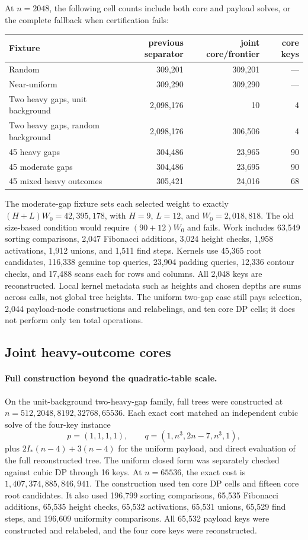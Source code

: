 \documentclass[11pt]{article}
\begin{document}
At $n=2048$, the following cell counts include both core and payload solves,
or the complete fallback when certification fails:
\begin{center}\small
\begin{tabular}{lrrr}
\toprule
Fixture & previous separator & joint core/frontier & core keys\\
\midrule
Random & 309,201 & 309,201 & ---\\
Near-uniform & 309,290 & 309,290 & ---\\
Two heavy gaps, unit background & 2,098,176 & 10 & 4\\
Two heavy gaps, random background & 2,098,176 & 306,506 & 4\\
45 heavy gaps & 304,486 & 23,965 & 90\\
45 moderate gaps & 304,486 & 23,695 & 90\\
45 mixed heavy outcomes & 305,421 & 24,016 & 68\\
\bottomrule
\end{tabular}
\end{center}
The moderate-gap fixture sets each selected weight to exactly
$(H+L)W_0=42{,}395{,}178$, with $H=9$, $L=12$, and $W_0=2{,}018{,}818$.
The old size-based condition would require $(90+12)W_0$ and fails.
Work includes 63,549 sorting comparisons, 2,047 Fibonacci additions, 3,024
height checks, 1,958 activations, 1,912 unions, and 1,511 find steps. Kernels
use 45,365 root candidates, 116,338 genuine top queries, 23,904 padding queries,
12,336 contour checks, and 17,488 scans each for rows and columns. All 2,048
keys are reconstructed. Local kernel metadata such as heights and chosen
depths are sums across calls, not global tree heights. The uniform two-gap
case still pays selection, 2,044 payload-node constructions and relabelings,
and ten core DP cells; it does not perform only ten total operations.


\subsection{Joint heavy-outcome cores}
\paragraph{Full construction beyond the quadratic-table scale.}
On the unit-background two-heavy-gap family, full trees were constructed at
$n=512,2048,8192,32768,65536$. Each exact cost matched an independent cubic
solve of the four-key instance
\[
 p=(1,1,1,1),\qquad q=(1,n^3,2n-7,n^3,1),
\]
plus $2I_*(n-4)+3(n-4)$ for the uniform payload, and direct evaluation of the
full reconstructed tree. The uniform closed form was separately checked against
cubic DP through 16 keys. At $n=65536$, the exact cost is
$1{,}407{,}374{,}885{,}846{,}941$. The construction used ten core DP cells and fifteen core root candidates.
It also used 196,799 sorting comparisons, 65,535 Fibonacci additions, 65,535
height checks, 65,532 activations, 65,531 unions, 65,529 find steps, and 196,609
uniformity comparisons. All 65,532 payload keys were constructed and relabeled,
and the four core keys were reconstructed.
\end{document}
